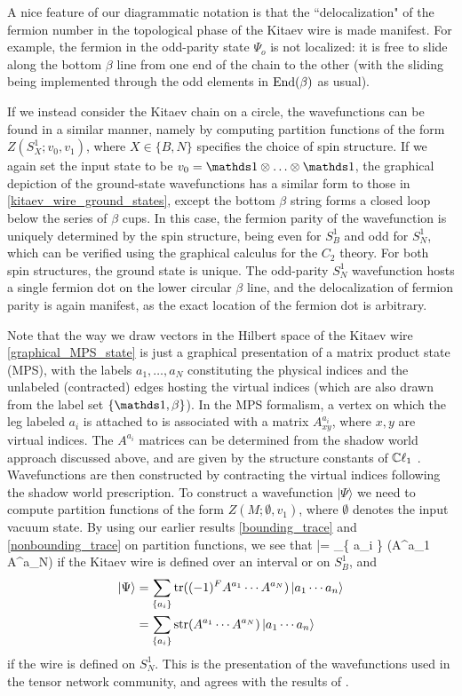 A nice feature of our diagrammatic notation is that the ``delocalization" of the fermion number in the topological phase of the 
Kitaev wire is made manifest.
For example, the fermion in the odd-parity state $\Psi_o$ is not localized: it is free to slide along the bottom $\beta$ line
from one end of the chain to the other (with the sliding being implemented through the odd elements in $\text{End}(\beta)$
as usual).

If we instead consider the Kitaev chain on a circle, the wavefunctions can be found in a similar manner, 
namely by computing partition functions of the form $Z(S^1_X;v_0,v_1)$, where $X\in\{B,N\}$
specifies the choice of spin structure. 
If we again set the input state to be $v_0=\unit\tp\dots\tp\unit$, the graphical depiction of the 
ground-state wavefunctions 
has a similar form to those in \eqref{kitaev_wire_ground_states}, except the bottom $\beta$ string 
forms a closed loop below the series of $\beta$ cups. 
In this case, the fermion parity of the wavefunction is uniquely determined by the spin structure, being 
even for $S^1_B$ and odd for $S^1_N$, which can be verified using the graphical calculus for the 
$C_2$ theory. For both spin structures, the ground state is unique. 
The odd-parity $S^1_N$ wavefunction hosts a single fermion dot on the lower circular $\beta$ line, 
and the delocalization of fermion parity is again manifest, as the exact location of the fermion dot 
is arbitrary. 

Note that the way we draw vectors in the Hilbert space of the Kitaev wire \eqref{graphical_MPS_state}
is just a graphical presentation of a matrix product state (MPS), with the labels
$a_1,\dots,a_N$ constituting the physical indices and the unlabeled (contracted) edges hosting the virtual 
indices (which are also drawn from the label set $\{\unit, \beta\}$). 
In the MPS formalism, a vertex on which the leg labeled $a_i$ is attached 
to is associated with a matrix $A^{a_i}_{xy}$, where $x,y$ are virtual indices. 
The $A^{a_i}$ matrices can be determined from the shadow world approach 
discussed above, and are given by the structure constants of $\mathbb{C}\ell_1$ \cite{turzillo2016}. 
Wavefunctions are then constructed by contracting the virtual indices following the 
shadow world prescription. To construct a wavefunction $|\Psi\rangle$ we need to compute 
partition functions of the form $Z(M;\emptyset,v_1)$, where $\emptyset$ denotes 
the input vacuum state. 
By using our earlier results \eqref{bounding_trace} and \eqref{nonbounding_trace} on 
partition functions, we see that 
\be |\Psi\rangle = \sum_{\{ a_i \} }\tr(A^{a_1} \cdots A^{a_N})  \ee
if the Kitaev wire is defined over an interval or on $S^1_B$, and 
\begin{align}
 |\Psi\rangle & = \sum_{\{ a_i \} }\text{tr}((-1)^FA^{a_1} \cdots A^{a_N}) \left|a_1 \cdots a_n\right\rangle \\ 
 & =\sum_{\{ a_i \} }\text{str}(A^{a_1} \cdots A^{a_N}) \left|a_1 \cdots a_n\right\rangle 
 \end{align}
if the wire is defined on $S^1_N$. 
This is the presentation of the wavefunctions used in the tensor network community, 
and agrees with the results of \cite{turzillo2016,bultinck2017b}. 

